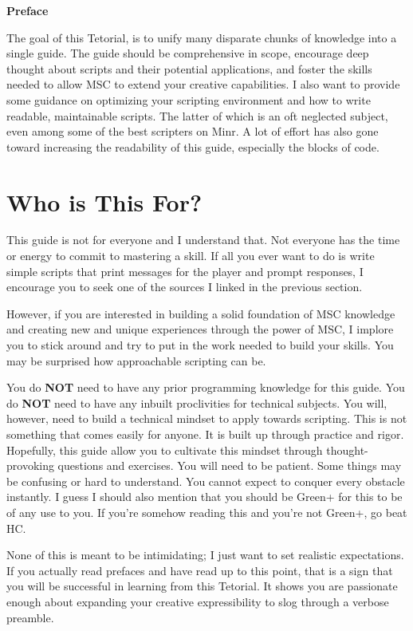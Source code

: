 \documentclass[oneside]{book}
\newcommand{\prefacename}{Preface}
\newenvironment{preface}{
    \vspace*{\stretch{2}}
    {\noindent \bfseries \Huge \prefacename}
    \begin{center}
        \phantomsection \addcontentsline{toc}{chapter}{\prefacename} %
        \thispagestyle{plain}
    \end{center}%
}
{\vspace*{\stretch{5}}}
\begin{document}
\begin{preface}
The goal of this Tetorial, is to unify many disparate chunks of knowledge into a single guide. The guide should be comprehensive in scope, encourage deep thought about scripts and their potential applications, and foster the skills needed to allow MSC to extend your creative capabilities. I also want to provide some guidance on optimizing your scripting environment and how to write readable, maintainable scripts. The latter of which is an oft neglected subject, even among some of the best scripters on Minr. A lot of effort has also gone toward increasing the readability of this guide, especially the blocks of code.

\section*{Who is This For?}
This guide is not for everyone and I understand that. Not everyone has the time or energy to commit to mastering a skill. If all you ever want to do is write simple scripts that print messages for the player and prompt responses, I encourage you to seek one of the sources I linked in the previous section.

However, if you are interested in building a solid foundation of MSC knowledge and creating new and unique experiences through the power of MSC, I implore you to stick around and try to put in the work needed to build your skills. You may be surprised how approachable scripting can be.

You do \textbf{NOT} need to have any prior programming knowledge for this guide. You do \textbf{NOT} need to have any inbuilt proclivities for technical subjects. You will, however, need to build a technical mindset to apply towards scripting. This is not something that comes easily for anyone. It is built up through practice and rigor. Hopefully, this guide allow you to cultivate this mindset through thought-provoking questions and exercises. You will need to be patient. Some things may be confusing or hard to understand. You cannot expect to conquer every obstacle instantly. I guess I should also mention that you should be Green+ for this to be of any use to you. If you're somehow reading this and you're not Green+, go beat HC.

None of this is meant to be intimidating; I just want to set realistic expectations. If you actually read prefaces and have read up to this point, that is a sign that you will be successful in learning from this Tetorial. It shows you are passionate enough about expanding your creative expressibility to slog through a verbose preamble.


\end{preface}
\end{document}
